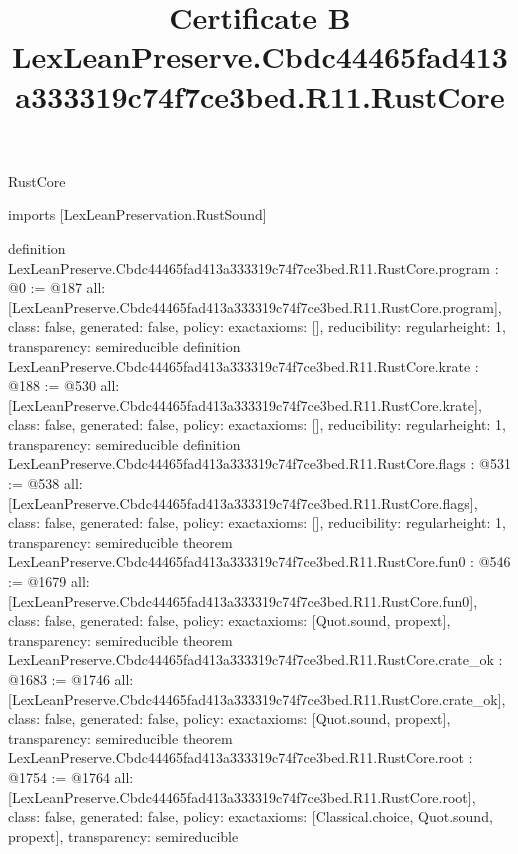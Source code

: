 \begin{lexlean}{RustCore}
\title{Certificate B LexLeanPreserve.Cbdc44465fad413a333319c74f7ce3bed.R11.RustCore}
\begin{coremodule}
imports [LexLeanPreservation.RustSound]

definition LexLeanPreserve.Cbdc44465fad413a333319c74f7ce3bed.R11.RustCore.program : @0 := @187 {
  all: [LexLeanPreserve.Cbdc44465fad413a333319c74f7ce3bed.R11.RustCore.program],
  class: false,
  generated: false,
  policy: exact{axioms: []},
  reducibility: regular{height: 1},
  transparency: semireducible
}
definition LexLeanPreserve.Cbdc44465fad413a333319c74f7ce3bed.R11.RustCore.krate : @188 := @530 {
  all: [LexLeanPreserve.Cbdc44465fad413a333319c74f7ce3bed.R11.RustCore.krate],
  class: false,
  generated: false,
  policy: exact{axioms: []},
  reducibility: regular{height: 1},
  transparency: semireducible
}
definition LexLeanPreserve.Cbdc44465fad413a333319c74f7ce3bed.R11.RustCore.flags : @531 := @538 {
  all: [LexLeanPreserve.Cbdc44465fad413a333319c74f7ce3bed.R11.RustCore.flags],
  class: false,
  generated: false,
  policy: exact{axioms: []},
  reducibility: regular{height: 1},
  transparency: semireducible
}
theorem LexLeanPreserve.Cbdc44465fad413a333319c74f7ce3bed.R11.RustCore.fun0 : @546 := @1679 {
  all: [LexLeanPreserve.Cbdc44465fad413a333319c74f7ce3bed.R11.RustCore.fun0],
  class: false,
  generated: false,
  policy: exact{axioms: [Quot.sound, propext]},
  transparency: semireducible
}
theorem LexLeanPreserve.Cbdc44465fad413a333319c74f7ce3bed.R11.RustCore.crate_ok : @1683 := @1746 {
  all: [LexLeanPreserve.Cbdc44465fad413a333319c74f7ce3bed.R11.RustCore.crate_ok],
  class: false,
  generated: false,
  policy: exact{axioms: [Quot.sound, propext]},
  transparency: semireducible
}
theorem LexLeanPreserve.Cbdc44465fad413a333319c74f7ce3bed.R11.RustCore.root : @1754 := @1764 {
  all: [LexLeanPreserve.Cbdc44465fad413a333319c74f7ce3bed.R11.RustCore.root],
  class: false,
  generated: false,
  policy: exact{axioms: [Classical.choice, Quot.sound, propext]},
  transparency: semireducible
}


\end{coremodule}
\end{lexlean}
